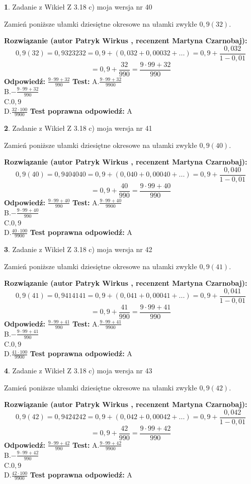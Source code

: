 \documentclass[12pt, a4paper]{article}
\theoremstyle{definition} %
\newtheorem{zad}{}
\newcommand{\zadStart}[1]{\begin{zad}#1\newline}
\newcommand{\zadStop}{\end{zad}}
\newcommand{\rozwStart}[2]{\noindent \textbf{Rozwiązanie (autor #1 , recenzent #2): }\newline}
\newcommand{\rozwStop}{\newline}
\newcommand{\odpStart}{\noindent \textbf{Odpowiedź:}\newline}
\newcommand{\odpStop}{\newline}
\newcommand{\testStart}{\noindent \textbf{Test:}\newline}
\newcommand{\testStop}{\newline}
\newcommand{\kluczStart}{\noindent \textbf{Test poprawna odpowiedź:}\newline}
\newcommand{\kluczStop}{\newline}
\begin{document}
\zadStart{Zadanie z Wikieł Z 3.18 c) moja wersja nr 40}

Zamień poniższe ułamki dziesiętne okresowe na ułamki zwykłe $0,9(32)$.
\zadStop
\rozwStart{Patryk Wirkus}{Martyna Czarnobaj}
$$0,9(32)=0,9323232=0,9+(0,032+0,00032+...)=0,9+\frac{0,032}{1-0,01}$$
$$=0,9+\frac{32}{990}=\frac{9\cdot99+32}{990}$$
\rozwStop
\odpStart
$\frac{9\cdot99+32}{990}$
\odpStop
\testStart
A.$\frac{9\cdot99+32}{9900}$\\ B.$-\frac{9\cdot99+32}{990}$\\ C.$0,9$\\ D.$\frac{32\cdot100}{9900}$
\testStop
\kluczStart
A
\kluczStop



\zadStart{Zadanie z Wikieł Z 3.18 c) moja wersja nr 41}

Zamień poniższe ułamki dziesiętne okresowe na ułamki zwykłe $0,9(40)$.
\zadStop
\rozwStart{Patryk Wirkus}{Martyna Czarnobaj}
$$0,9(40)=0,9404040=0,9+(0,040+0,00040+...)=0,9+\frac{0,040}{1-0,01}$$
$$=0,9+\frac{40}{990}=\frac{9\cdot99+40}{990}$$
\rozwStop
\odpStart
$\frac{9\cdot99+40}{990}$
\odpStop
\testStart
A.$\frac{9\cdot99+40}{9900}$\\ B.$-\frac{9\cdot99+40}{990}$\\ C.$0,9$\\ D.$\frac{40\cdot100}{9900}$
\testStop
\kluczStart
A
\kluczStop



\zadStart{Zadanie z Wikieł Z 3.18 c) moja wersja nr 42}

Zamień poniższe ułamki dziesiętne okresowe na ułamki zwykłe $0,9(41)$.
\zadStop
\rozwStart{Patryk Wirkus}{Martyna Czarnobaj}
$$0,9(41)=0,9414141=0,9+(0,041+0,00041+...)=0,9+\frac{0,041}{1-0,01}$$
$$=0,9+\frac{41}{990}=\frac{9\cdot99+41}{990}$$
\rozwStop
\odpStart
$\frac{9\cdot99+41}{990}$
\odpStop
\testStart
A.$\frac{9\cdot99+41}{9900}$\\ B.$-\frac{9\cdot99+41}{990}$\\ C.$0,9$\\ D.$\frac{41\cdot100}{9900}$
\testStop
\kluczStart
A
\kluczStop



\zadStart{Zadanie z Wikieł Z 3.18 c) moja wersja nr 43}

Zamień poniższe ułamki dziesiętne okresowe na ułamki zwykłe $0,9(42)$.
\zadStop
\rozwStart{Patryk Wirkus}{Martyna Czarnobaj}
$$0,9(42)=0,9424242=0,9+(0,042+0,00042+...)=0,9+\frac{0,042}{1-0,01}$$
$$=0,9+\frac{42}{990}=\frac{9\cdot99+42}{990}$$
\rozwStop
\odpStart
$\frac{9\cdot99+42}{990}$
\odpStop
\testStart
A.$\frac{9\cdot99+42}{9900}$\\ B.$-\frac{9\cdot99+42}{990}$\\ C.$0,9$\\ D.$\frac{42\cdot100}{9900}$
\testStop
\kluczStart
A
\kluczStop
\end{document}
